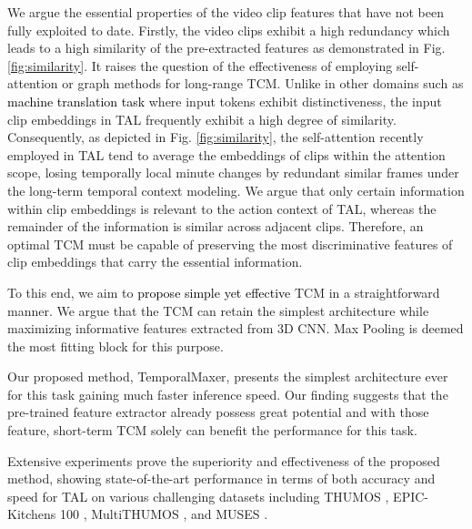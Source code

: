 \documentclass[10pt,twocolumn,letterpaper]{article}
\newcommand{\ky}[1]{\textcolor{black}{{#1}}}
\newcommand{\tuan}[1]{\textcolor{black}{{#1}}}
\begin{document}
We argue the essential properties of the video clip features that have not been fully exploited to date. 
Firstly, the video clips exhibit a high redundancy which leads to a high similarity of the pre-extracted features as demonstrated in Fig. \ref{fig:similarity}. It raises the question of the effectiveness of employing self-attention or graph methods for long-range TCM. Unlike in other domains such as \tuan{machine translation task} where input tokens exhibit distinctiveness, the input clip embeddings in TAL frequently exhibit a high degree of similarity. Consequently, as depicted in Fig. \ref{fig:similarity}, the self-attention recently employed in TAL tend to average the embeddings of clips within the attention scope, losing temporally local minute changes by redundant similar frames under the long-term temporal context modeling.
We argue that only certain information within clip embeddings is relevant to the action context of TAL, whereas the remainder of the information is similar across adjacent clips. Therefore, an optimal TCM must be capable of preserving the most discriminative features of clip embeddings that carry the essential information.






To this end, we aim to \ky{propose simple yet effective} TCM in a straightforward manner. 
We argue that the TCM can retain the simplest architecture while maximizing informative features extracted from 3D CNN.
Max Pooling \cite{boureau2010theoretical} is deemed the most fitting block for this purpose. 


Our proposed method, TemporalMaxer, presents the simplest architecture ever for this task gaining much faster inference speed.  
Our finding suggests that the pre-trained feature extractor already possess great potential and with those feature, short-term TCM solely can benefit the performance for this task.

Extensive experiments prove the superiority and effectiveness of the proposed method, showing state-of-the-art performance in terms of both accuracy and speed for TAL on various challenging datasets including THUMOS \cite{idrees2017thumos}, EPIC-Kitchens 100 \cite{damen2020rescaling}, MultiTHUMOS \cite{yeung2018every}, and MUSES \cite{liu2021multi}.
\end{document}
